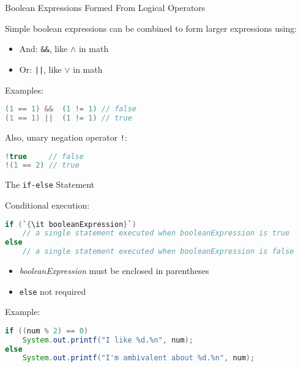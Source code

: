 \documentclass{beamer}
\begin{document}
\begin{frame}[fragile]{Boolean Expressions Formed From Logical Operators}


Simple boolean expressions can be combined to form larger expressions using:
\begin{itemize}
\item And: {\tt \&\&}, like $\land$ in math
\item Or: {\tt ||}, like $\lor$ in math
\end{itemize}
Examples:
\begin{lstlisting}[language=Java]
(1 == 1) &&  (1 != 1) // false
(1 == 1) ||  (1 != 1) // true
\end{lstlisting}

Also, unary negation operator {\tt !}:

\begin{lstlisting}[language=Java]
!true     // false
!(1 == 2) // true
\end{lstlisting}


\end{frame}

\begin{frame}[fragile]{The {\tt if-else} Statement}


Conditional execution:
\begin{lstlisting}[language=Java,escapechar=`]
if (`{\it booleanExpression}`)
    // a single statement executed when booleanExpression is true
else
    // a single statement executed when booleanExpression is false
\end{lstlisting}
\vspace{-.1in}
\begin{itemize}
\item {\it booleanExpression} must be enclosed in parentheses
\item {\tt else} not required
\end{itemize}

Example:
\begin{lstlisting}[language=Java]
if ((num % 2) == 0)
    System.out.printf("I like %d.%n", num);
else
    System.out.printf("I'm ambivalent about %d.%n", num);
\end{lstlisting}

\end{frame}
\end{document}
